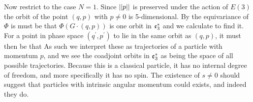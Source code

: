 \documentclass{article}
\begin{document}
\begin{example}
Now restrict to the case $N=1$. Since $\left\lvert\left\lvert p \right\rvert\right\rvert$ is preserved under the action of $E(3)$ the orbit of the point $(q,p)$ with $p \neq 0$ is 5-dimensional. By the equivariance of $\Phi$ is must be that $\Phi(G\cdot(q,p))$ is one orbit in $\mathfrak{e}_3^\ast$ and we calculate 
to find it. For a point in phase space $(q^\prime,p^\prime)$ to lie in the same orbit as $(q,p)$, it must then be that 
As such we interpret these as trajectories of a particle with momentum $p$, and we see the coadjoint orbits in $\mathfrak{e}_3^\ast$ as being the space of all possible trajectories. Because this is a classical particle, it has no internal degree of freedom, and more specifically it has no spin. The existence of $s \neq 0$ should suggest that particles with intrinsic angular momentum could exists, and indeed they do. 
\end{example}

\end{document}

